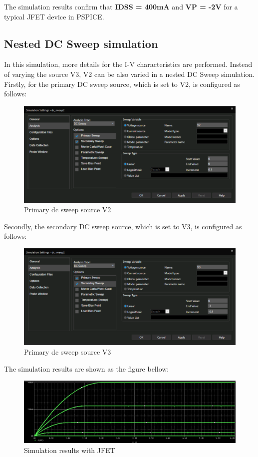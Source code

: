 The simulation results confirm that \textbf{IDSS = 400mA} and \textbf{VP = -2V} for a typical JFET device in PSPICE.

\subsection{Nested DC Sweep simulation}
In this simulation, more details for the I-V characteristics are performed. Instead of varying the source V3, V2 can be also varied in a nested DC Sweep simulation.\\

Firstly, for the primary DC sweep source, which is set to V2, is configured as follows:
\begin{figure}[!htp]
    \centering
    \includegraphics[width = 4.5in]{source/picture/bai_6/jfet4.PNG}
    \caption{Primary dc sweep source V2}
    \label{jfet_4}
\end{figure}

Secondly, the secondary DC sweep source, which is set to V3, is configured as follows:

\begin{figure}[!htp]
    \centering
    \includegraphics[width = 4.5in]{source/picture/bai_6/jfet5.PNG}
    \caption{Primary dc sweep source V3}
    \label{jfet_5}
\end{figure}

The simulation results are shown as the figure bellow:

\begin{figure}[!htp]
    \centering
    \includegraphics[width = 4.5in]{source/picture/bai_6/jfet6.PNG}
    \caption{Simulation results with JFET}
    \label{jfet_6}
\end{figure}

